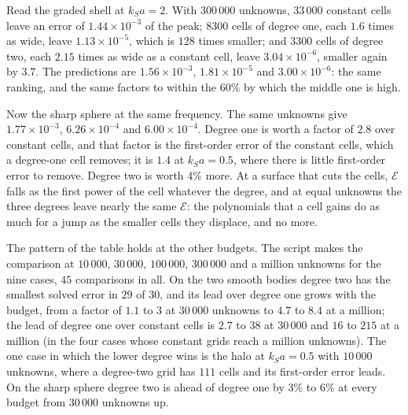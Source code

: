 \documentclass[11pt,a4paper]{article}
\newcommand{\cE}{\mathcal{E}}
\begin{document}
Read the graded shell at $k_Sa=2$. With $300\,000$ unknowns, $33\,000$ constant cells leave an error of
$1.44\times10^{-3}$ of the peak; $8300$ cells of degree one, each $1.6$ times as wide, leave
$1.13\times10^{-5}$, which is $128$ times smaller; and $3300$ cells of degree two, each $2.15$ times as
wide as a constant cell, leave $3.04\times10^{-6}$, smaller again by $3.7$. The predictions are
$1.56\times10^{-3}$, $1.81\times10^{-5}$ and $3.00\times10^{-6}$: the same ranking, and the same factors
to within the $60\%$ by which the middle one is high.

Now the sharp sphere at the same frequency. The same unknowns give $1.77\times10^{-3}$, $6.26\times10^{-4}$
and $6.00\times10^{-4}$. Degree one is worth a factor of $2.8$ over constant cells, and that factor is
the first-order error of the constant cells, which a degree-one cell removes; it is $1.4$ at $k_Sa=0.5$,
where there is little first-order error to remove. Degree two is worth $4\%$ more. At a surface that cuts
the cells, $\cE$ falls as the first power of the cell whatever the degree, and at equal unknowns the three
degrees leave nearly the same $\cE$: the polynomials that a cell gains do as much for a jump as the
smaller cells they displace, and no more.

The pattern of the table holds at the other budgets. The script makes the comparison at $10\,000$,
$30\,000$, $100\,000$, $300\,000$ and a million unknowns for the nine cases, $45$ comparisons in all. On
the two smooth bodies degree two has the smallest solved error in $29$ of $30$, and its lead over degree
one grows with the budget, from a factor of $1.1$ to $3$ at $30\,000$ unknowns to $4.7$ to $8.4$ at a
million; the lead of degree one over constant cells is $2.7$ to $38$ at $30\,000$ and $16$ to $215$ at a
million (in the four cases whose constant grids reach a million unknowns). The one case in which the lower degree wins is the halo at $k_Sa=0.5$ with $10\,000$ unknowns,
where a degree-two grid has $111$ cells and its first-order error leads. On the sharp sphere degree two
is ahead of degree one by $3\%$ to $6\%$ at every budget from $30\,000$ unknowns up.
\end{document}
